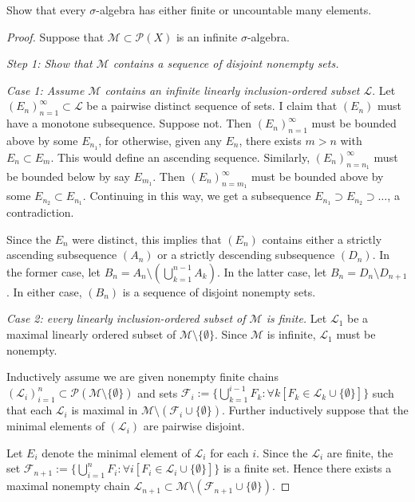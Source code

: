 \documentclass{article}
\begin{document}
 Show that every $\sigma$-algebra has either finite or uncountable many elements.
\begin{proof}
Suppose that $\mathcal M \subset \mathcal P (X)$ is an infinite $\sigma$-algebra. 

\emph{Step 1: Show that $\mathcal M$ contains a sequence of disjoint nonempty sets.}

\emph{Case 1: Assume $\mathcal M$ contains an infinite linearly inclusion-ordered subset $\mathcal L$}.  Let $(E_n)_{n=1}^\infty \subset \mathcal L$ be a pairwise distinct sequence of sets. I claim that $(E_n)$ must have a monotone subsequence. Suppose not. Then $(E_n)_{n=1}^\infty$ must be bounded above by some $E_{n_1}$, for otherwise, given any $E_n$, there exists $m > n$ with $E_n \subset E_m$. This would define an ascending sequence.  Similarly, $(E_n)_{n=n_1}^\infty$ must be bounded below by say $E_{m_1}$.  Then $(E_n)_{n=m_1}^\infty$ must be bounded above by some $E_{n_2} \subset E_{n_1}$. Continuing in this way, we get a subsequence $E_{n_1} \supset E_{n_2} \supset \ldots$, a contradiction.


Since the $E_n$ were distinct, this implies that $(E_n)$ contains either a strictly ascending subsequence $(A_n)$ or a strictly descending subsequence $(D_n)$.  In the former case, let $B_n = A_n \setminus ( \bigcup_{k=1}^{n-1} A_k)$. In the latter case, let $B_n = D_n \setminus D_{n+1}$.  In either case, $(B_n)$ is a sequence of disjoint nonempty sets.

\emph{Case 2: every linearly inclusion-ordered subset of $\mathcal M$ is finite.}  Let $\mathcal L_1$  be a maximal linearly ordered subset of $\mathcal M \setminus \{\emptyset\}$.  Since $\mathcal M$ is infinite, $\mathcal L_1$ must be nonempty.

Inductively assume we are given nonempty finite chains $(\mathcal L_i)_{i=1}^n \subset \mathcal P ( \mathcal M \setminus \{\emptyset\} )$  and sets $\mathcal F_i := \{ \bigcup_{k=1}^{i-1} F_k : \forall k \left[ F_k \in \mathcal L_k \cup \{\emptyset\} \right]\}$ such that each $\mathcal L_i$ is maximal in  $\mathcal M \setminus (\mathcal F_i \cup \{\emptyset\})$. Further inductively suppose that the minimal elements of $(\mathcal L_i)$ are pairwise disjoint.

Let $E_i$ denote the minimal element of $\mathcal L_i$ for each $i$.  Since the $\mathcal L_i$ are finite, the set $\mathcal F_{n+1} := \{ \bigcup_{i=1}^n F_i : \forall i \left[ F_i \in \mathcal L_i \cup \{\emptyset\} \right]\}$ is a finite set. Hence there exists a maximal nonempty chain $\mathcal L_{n+1} \subset \mathcal M \setminus (\mathcal F_{n+1} \cup \{\emptyset\})$. 


\end{proof}
\end{document}
